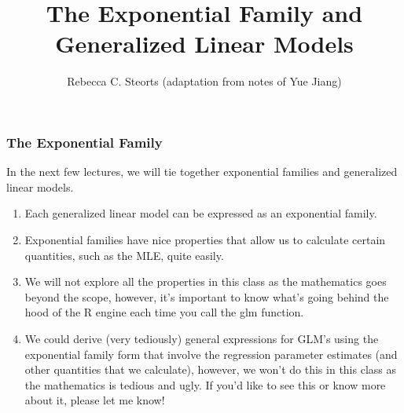 \documentclass{beamer}
\title{The Exponential Family and \\ Generalized Linear Models}
\author{Rebecca C. Steorts (adaptation from notes of Yue Jiang)}
\begin{document}
\begin{frame}
  \titlepage
\end{frame}




\begin{frame}
\frametitle{The Exponential Family}

In the next few lectures, we will tie together exponential families and generalized linear models. 

\begin{enumerate}
\item Each generalized linear model can be expressed as an exponential family. 
\item Exponential families have nice properties that allow us to calculate certain quantities, such as the MLE, quite easily. 
\item We will not explore all the properties in this class as the mathematics goes beyond the scope, however, it's important to know what's going behind the hood of the R engine each time you call the glm function. 
\item We could derive (very tediously) general expressions for GLM's using the exponential family form that involve the regression parameter estimates (and other quantities that we calculate), however, we won't do this in this class as the mathematics is tedious and ugly. If you'd like to see this or know more about it, please let me know! 
\end{enumerate}



\end{frame}
\end{document}
